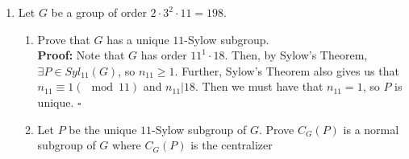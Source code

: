 \documentclass{article}
\begin{document}
\begin{enumerate}
\begin{enumerate}
        First, note that $|P|=|Q| = p^3$. Also note that $P \cap Q \leq P$ and $P \cap Q \leq Q$. Then, by La Grange's Theorem, $|P \cap Q| 
        \big |P|$ and $|P \cap Q| \big |Q|$. Then $|P \cap Q| \in \{p,p^2,p^3\}$. Further, since $P$ and $Q$ are distinct, we know that 
        $\exists a \in P$ such that $a \notin Q$. Similarly, $\exists b \in Q$ such that $b \notin P$. Then we must have that $P \cap Q$ is 
        a proper subgroup of $P$ and also a proper subgroup of $Q$. Then we must have that $|P \cap Q| < p^3$, which means that $|P \cap Q| 
        \in \{p,p^2\}$.
        
        Now, assume that $|P \cap Q| = p$. Then, since $P$ and $Q$ are both finite, we have
        \begin{align*}
            |PQ| &= \dfrac{|P||Q|}{|P \cap Q|} \\
            &= \dfrac{p^3 \cdot p^3}{p} \\
            &= p^5.
        \end{align*}
        Note that $PQ \leq G$, so $|PQ| \leq |G|$. Then we must have that $p^5 \leq p^3qr \Longrightarrow p^2 \leq qr$. Now, say $p = 5$, 
        $q = 3$, and $r = 2$. Then $p^2 = 25$ and $qr = 6$. But this is a contradiction, which means that we would need for $p < q$ or 
        $p < r$, which is a contradiction. Then we cannot have that $|P \cap Q| = p$. This means that the only remaining possibility is 
        $|P \cap Q| = p^2$. $\square$
        \item Prove that $N_G(P \cap Q)$ contains both $P$ and $Q$. Here $N_G(P \cap Q)$ is the normalizer of $P \cap Q$ in $G$.
        \item Prove that $P \cap Q$ is normal in $G$.
    \end{enumerate}
    \item Let $G$ be a group of order $2 \cdot 3^2 \cdot 11 = 198$.
    \begin{enumerate}
        \item Prove that $G$ has a unique $11$-Sylow subgroup. \\
        \textbf{Proof:} Note that $G$ has order $11^1 \cdot 18$. Then, by Sylow's Theorem, $\exists P \in Syl_{11}(G)$, so $n_{11} \geq 1$. 
        Further, Sylow's Theorem also gives us that $n_{11} \equiv 1(\mod{11})$ and $n_{11} \big| 18$. Then we must have that $n_{11}=1$, 
        so $P$ is unique. $\square$
        \item Let $P$ be the unique $11$-Sylow subgroup of $G$. Prove $C_G(P)$ is a normal subgroup of $G$ where $C_G(P)$ is the centralizer 

\end{enumerate}
\end{enumerate}
\end{document}
